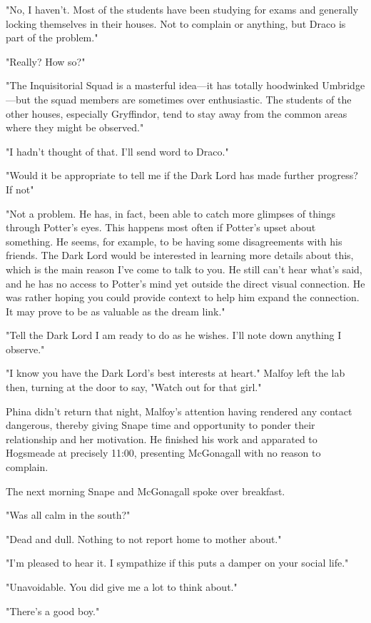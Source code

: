 "No, I haven't. Most of the students have been studying for exams and generally locking themselves in their houses. Not to complain or anything, but Draco is part of the problem."

"Really? How so?"

"The Inquisitorial Squad is a masterful idea—it has totally hoodwinked Umbridge—but the squad members are sometimes over enthusiastic. The students of the other houses, especially Gryffindor, tend to stay away from the common areas where they might be observed."

"I hadn't thought of that. I'll send word to Draco."

"Would it be appropriate to tell me if the Dark Lord has made further progress? If not{\el}"

"Not a problem. He has, in fact, been able to catch more glimpses of things through Potter's eyes. This happens most often if Potter's upset about something. He seems, for example, to be having some disagreements with his friends. The Dark Lord would be interested in learning more details about this, which is the main reason I've come to talk to you. He still can't hear what's said, and he has no access to Potter's mind yet outside the direct visual connection. He was rather hoping you could provide context to help him expand the connection. It may prove to be as valuable as the dream link."

"Tell the Dark Lord I am ready to do as he wishes. I'll note down anything I observe."

"I know you have the Dark Lord's best interests at heart." Malfoy left the lab then, turning at the door to say, "Watch out for that girl."

Phina didn't return that night, Malfoy's attention having rendered any contact dangerous, thereby giving Snape time and opportunity to ponder their relationship and her motivation. He finished his work and apparated to Hogsmeade at precisely 11:00, presenting McGonagall with no reason to complain.

The next morning Snape and McGonagall spoke over breakfast.

"Was all calm in the south?"

"Dead and dull. Nothing to not report home to mother about."

"I'm pleased to hear it. I sympathize if this puts a damper on your social life."

"Unavoidable. You did give me a lot to think about."

"There's a good boy."

